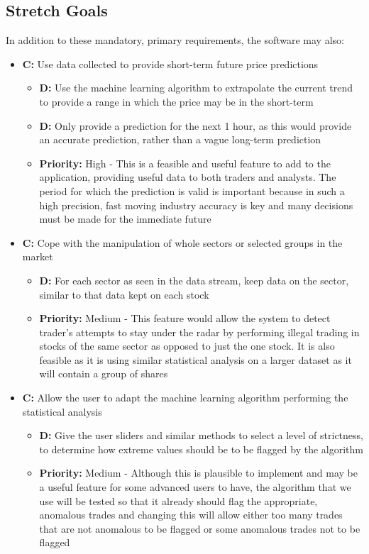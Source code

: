 \documentclass[11pt, oneside, a4paper]{article}
\begin{document}
\subsection{Stretch Goals}
In addition to these mandatory, primary requirements, the software may also:
\begin{itemize}
	\item \textbf{C:} Use data collected to provide short-term future price predictions
	\begin{itemize}
		\item \textbf{D:} Use the machine learning algorithm to extrapolate the current trend to provide a range in which the price may be in the short-term
		\item \textbf{D:} Only provide a prediction for the next 1 hour, as this would provide an accurate prediction, rather than a vague long-term prediction
		\item \textbf{Priority:} High - This is a feasible and useful feature to add to the application, providing useful data to both traders and analysts. The period for which the prediction is valid is important because in such a high precision, fast moving industry accuracy is key and many decisions must be made for the immediate future
	\end{itemize}
	\item \textbf{C:} Cope with the manipulation of whole sectors or selected groups in the market
	\begin{itemize}
		\item \textbf{D:} For each sector as seen in the data stream, keep data on the sector, similar to that data kept on each stock
		\item \textbf{Priority:} Medium - This feature would allow the system to detect trader’s attempts to stay under the radar by performing illegal trading in stocks of the same sector as opposed to just the one stock. It is also feasible as it is using similar statistical analysis on a larger dataset as it will contain a group of shares
	\end{itemize}
	\item \textbf{C:} Allow the user to adapt the machine learning algorithm performing the statistical analysis
	\begin{itemize}
		\item \textbf{D:} Give the user sliders and similar methods to select a level of strictness, to determine how extreme values should be to be flagged by the algorithm
		\item \textbf{Priority:} Medium - Although this is plausible to implement and may be a useful feature for some advanced users to have, the algorithm that we use will be tested so that it already should flag the appropriate, anomalous trades and changing this will allow either too many trades that are not anomalous to be flagged or some anomalous trades not to be flagged

\end{itemize}
\end{itemize}
\end{document}
